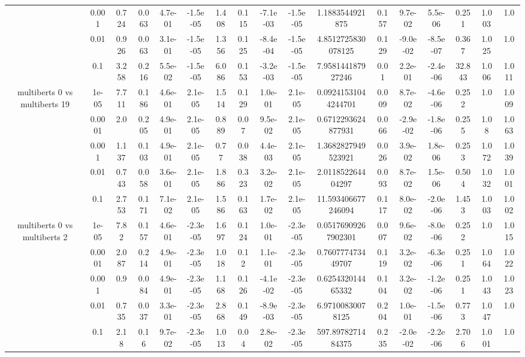 \begin{tabular}{|c|c|c|c|c|c|c|c|c|c|c|c|c|c|c|c|c|}
 & 0.001 & 0.724 & 0.063 & 4.7e-01 & -1.5e-05 & 1.408 & 0.115 & -7.1e-03 & -1.5e-05 & 1.1883544921875 & 0.157 & 9.7e-02 & 5.5e-06 & 0.251 & 1.003 & 1.0 \\
 & 0.01 & 0.926 & 0.063 & 3.1e-01 & -1.5e-05 & 1.356 & 0.125 & -8.4e-04 & -1.5e-05 & 4.8512725830078125 & 0.129 & -9.0e-02 & -8.5e-07 & 0.367 & 1.025 & 1.0 \\
 & 0.1 & 3.258 & 0.216 & 5.5e-02 & -1.5e-05 & 6.086 & 0.153 & -3.2e-03 & -1.5e-05 & 7.958144187927246 & 0.01 & 2.2e-01 & -2.4e-06 & 32.843 & 1.006 & 1.011 \\
\hline
\multirow{5}{*}{multiberts 0 vs multiberts 19} & 1e-05 & 7.711 & 0.186 & 4.6e-01 & 2.1e-05 & 1.514 & 0.129 & 1.0e-01 & 2.1e-05 & 0.09241531044244701 & 0.009 & 8.7e-02 & -4.6e-06 & 0.252 & 1.0 & 1.009 \\
 & 0.0001 & 2.0 & 0.205 & 4.9e-01 & 2.1e-05 & 0.889 & 0.07 & 9.5e-02 & 2.1e-05 & 0.6712293624877931 & 0.066 & -2.9e-02 & -1.8e-06 & 0.255 & 1.08 & 1.063 \\
 & 0.001 & 1.137 & 0.103 & 4.9e-01 & 2.1e-05 & 0.77 & 0.038 & 4.4e-03 & 2.1e-05 & 1.3682827949523921 & 0.026 & 3.9e-02 & 1.8e-06 & 0.253 & 1.072 & 1.039 \\
 & 0.01 & 0.743 & 0.058 & 3.6e-01 & 2.1e-05 & 1.886 & 0.323 & 3.2e-02 & 2.1e-05 & 2.011852264404297 & 0.093 & 8.7e-02 & 1.5e-06 & 0.504 & 1.032 & 1.001 \\
 & 0.1 & 2.753 & 0.171 & 7.1e-02 & 2.1e-05 & 1.586 & 0.163 & 1.7e-02 & 2.1e-05 & 11.593406677246094 & 0.117 & 8.0e-02 & -2.0e-06 & 1.453 & 1.003 & 1.002 \\
\hline
\multirow{5}{*}{multiberts 0 vs multiberts 2} & 1e-05 & 7.82 & 0.157 & 4.6e-01 & -2.3e-05 & 1.697 & 0.124 & 1.0e-01 & -2.3e-05 & 0.05176909267902301 & 0.007 & 9.6e-02 & -8.0e-06 & 0.252 & 1.0 & 1.015 \\
 & 0.0001 & 2.087 & 0.214 & 4.9e-01 & -2.3e-05 & 1.018 & 0.12 & 1.1e-01 & -2.3e-05 & 0.760777473449707 & 0.119 & 3.2e-02 & -6.3e-06 & 0.251 & 1.064 & 1.022 \\
 & 0.001 & 0.9 & 0.084 & 4.9e-01 & -2.3e-05 & 1.168 & 0.126 & -4.1e-02 & -2.3e-05 & 0.625432014465332 & 0.104 & 3.2e-02 & -1.2e-06 & 0.251 & 1.043 & 1.023 \\
 & 0.01 & 0.735 & 0.037 & 3.3e-01 & -2.3e-05 & 2.868 & 0.149 & -8.9e-03 & -2.3e-05 & 6.97100830078125 & 0.204 & 1.0e-01 & -1.5e-06 & 0.773 & 1.047 & 1.0 \\
 & 0.1 & 2.18 & 0.16 & 9.7e-02 & -2.3e-05 & 1.013 & 0.04 & 2.8e-02 & -2.3e-05 & 597.8978271484375 & 0.235 & -2.0e-02 & -2.2e-06 & 2.706 & 1.001 & 1.0 \\

\end{tabular}
